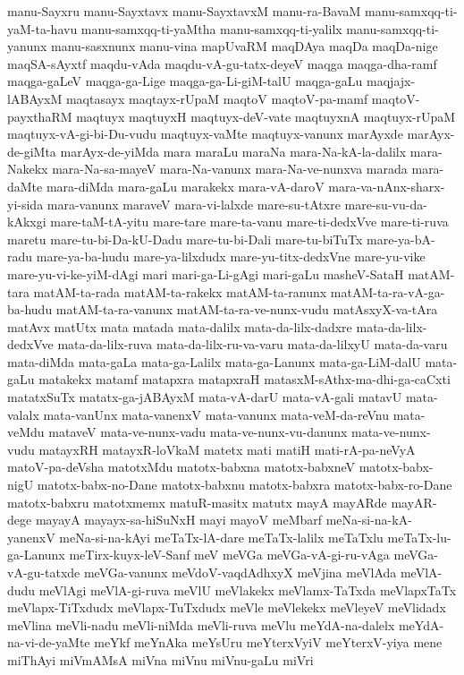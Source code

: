 {manu-Sayxru
manu-Sayxtavx
manu-SayxtavxM
manu-ra-BavaM
manu-samxqq-ti-yaM-ta-havu
manu-samxqq-ti-yaMtha
manu-samxqq-ti-yalilx
manu-samxqq-ti-yanunx
manu-sasxnunx
manu-vina
mapUvaRM
maqDAya
maqDa
maqDa-nige
maqSA-sAyxtf
maqdu-vAda
maqdu-vA-gu-tatx-deyeV
maqga
maqga-dha-ramf
maqga-gaLeV
maqga-ga-Lige
maqga-ga-Li-giM-talU
maqga-gaLu
maqjajx-lABAyxM
maqtasayx
maqtayx-rUpaM
maqtoV
maqtoV-pa-mamf
maqtoV-payxthaRM
maqtuyx
maqtuyxH
maqtuyx-deV-vate
maqtuyxnA
maqtuyx-rUpaM
maqtuyx-vA-gi-bi-Du-vudu
maqtuyx-vaMte
maqtuyx-vanunx
marAyxde
marAyx-de-giMta
marAyx-de-yiMda
mara
maraLu
maraNa
mara-Na-kA-la-dalilx
mara-Nakekx
mara-Na-sa-mayeV
mara-Na-vanunx
mara-Na-ve-nunxva
marada
mara-daMte
mara-diMda
mara-gaLu
marakekx
mara-vA-daroV
mara-va-nAnx-sharx-yi-sida
mara-vanunx
maraveV
mara-vi-lalxde
mare-su-tAtxre
mare-su-vu-da-kAkxgi
mare-taM-tA-yitu
mare-tare
mare-ta-vanu
mare-ti-dedxVve
mare-ti-ruva
maretu
mare-tu-bi-Da-kU-Dadu
mare-tu-bi-Dali
mare-tu-biTuTx
mare-ya-bA-radu
mare-ya-ba-hudu
mare-ya-lilxdudx
mare-yu-titx-dedxVne
mare-yu-vike
mare-yu-vi-ke-yiM-dAgi
mari
mari-ga-Li-gAgi
mari-gaLu
masheV-SataH
matAM-tara
matAM-ta-rada
matAM-ta-rakekx
matAM-ta-ranunx
matAM-ta-ra-vA-ga-ba-hudu
matAM-ta-ra-vanunx
matAM-ta-ra-ve-nunx-vudu
matAsxyX-va-tAra
matAvx
matUtx
mata
matada
mata-dalilx
mata-da-lilx-dadxre
mata-da-lilx-dedxVve
mata-da-lilx-ruva
mata-da-lilx-ru-va-varu
mata-da-lilxyU
mata-da-varu
mata-diMda
mata-gaLa
mata-ga-Lalilx
mata-ga-Lanunx
mata-ga-LiM-dalU
mata-gaLu
matakekx
matamf
matapxra
matapxraH
matasxM-sAthx-ma-dhi-ga-caCxti
matatxSuTx
matatx-ga-jABAyxM
mata-vA-darU
mata-vA-gali
matavU
mata-valalx
mata-vanUnx
mata-vanenxV
mata-vanunx
mata-veM-da-reVnu
mata-veMdu
mataveV
mata-ve-nunx-vadu
mata-ve-nunx-vu-danunx
mata-ve-nunx-vudu
matayxRH
matayxR-loVkaM
matetx
mati
matiH
mati-rA-pa-neVyA
matoV-pa-deVsha
matotxMdu
matotx-babxna
matotx-babxneV
matotx-babx-nigU
matotx-babx-no-Dane
matotx-babxnu
matotx-babxra
matotx-babx-ro-Dane
matotx-babxru
matotxmemx
matuR-masitx
matutx
mayA
mayARde
mayAR-dege
mayayA
mayayx-sa-hiSuNxH
mayi
mayoV
meMbarf
meNa-si-na-kA-yanenxV
meNa-si-na-kAyi
meTaTx-lA-dare
meTaTx-lalilx
meTaTxlu
meTaTx-lu-ga-Lanunx
meTirx-kuyx-leV-Sanf
meV
meVGa
meVGa-vA-gi-ru-vAga
meVGa-vA-gu-tatxde
meVGa-vanunx
meVdoV-vaqdAdhxyX
meVjina
meVlAda
meVlA-dudu
meVlAgi
meVlA-gi-ruva
meVlU
meVlakekx
meVlamx-TaTxda
meVlapxTaTx
meVlapx-TiTxdudx
meVlapx-TuTxdudx
meVle
meVlekekx
meVleyeV
meVlidadx
meVlina
meVli-nadu
meVli-niMda
meVli-ruva
meVlu
meYdA-na-dalelx
meYdA-na-vi-de-yaMte
meYkf
meYnAka
meYsUru
meYterxVyiV
meYterxV-yiya
mene
miThAyi
miVmAMsA
miVna
miVnu
miVnu-gaLu
miVri
}
